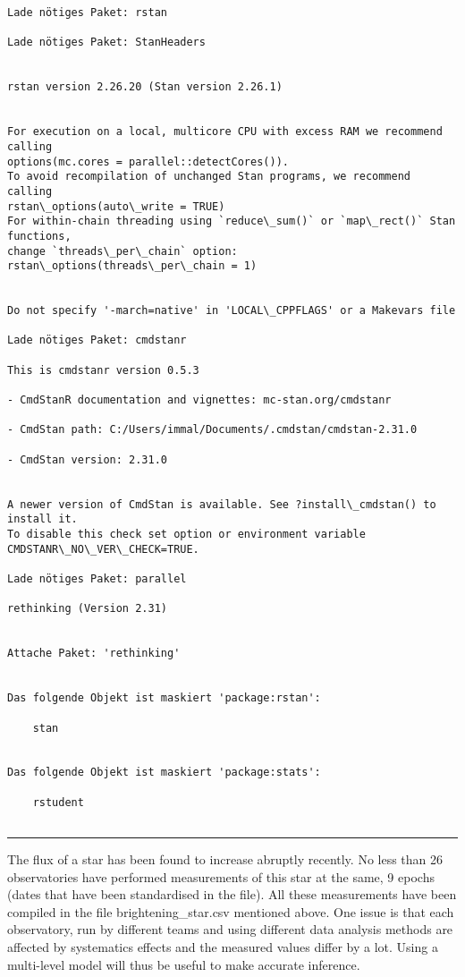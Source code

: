 \documentclass[11pt]{article}
\begin{document}
    \begin{Verbatim}[commandchars=\\\{\}]
Lade nötiges Paket: rstan

Lade nötiges Paket: StanHeaders


rstan version 2.26.20 (Stan version 2.26.1)


For execution on a local, multicore CPU with excess RAM we recommend calling
options(mc.cores = parallel::detectCores()).
To avoid recompilation of unchanged Stan programs, we recommend calling
rstan\_options(auto\_write = TRUE)
For within-chain threading using `reduce\_sum()` or `map\_rect()` Stan functions,
change `threads\_per\_chain` option:
rstan\_options(threads\_per\_chain = 1)


Do not specify '-march=native' in 'LOCAL\_CPPFLAGS' or a Makevars file

Lade nötiges Paket: cmdstanr

This is cmdstanr version 0.5.3

- CmdStanR documentation and vignettes: mc-stan.org/cmdstanr

- CmdStan path: C:/Users/immal/Documents/.cmdstan/cmdstan-2.31.0

- CmdStan version: 2.31.0


A newer version of CmdStan is available. See ?install\_cmdstan() to install it.
To disable this check set option or environment variable
CMDSTANR\_NO\_VER\_CHECK=TRUE.

Lade nötiges Paket: parallel

rethinking (Version 2.31)


Attache Paket: 'rethinking'


Das folgende Objekt ist maskiert 'package:rstan':

    stan


Das folgende Objekt ist maskiert 'package:stats':

    rstudent


    \end{Verbatim}

    \begin{center}\rule{0.5\linewidth}{0.5pt}\end{center}

The flux of a star has been found to increase abruptly recently. No less
than 26 observatories have performed measurements of this star at the
same, 9 epochs (dates that have been standardised in the file). All
these measurements have been compiled in the file brightening\_star.csv
mentioned above. One issue is that each observatory, run by different
teams and using different data analysis methods are affected by
systematics effects and the measured values differ by a lot. Using a
multi-level model will thus be useful to make accurate inference.
\end{document}
